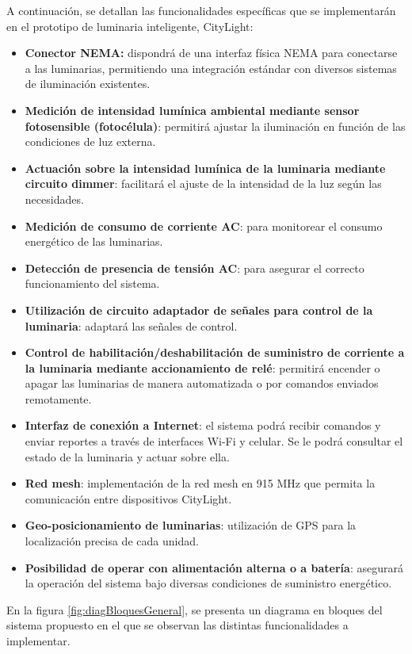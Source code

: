 \documentclass[
11pt, %
]{charter}
\begin{document}
A continuación, se detallan las funcionalidades específicas que se implementarán en el prototipo de luminaria inteligente, CityLight:

\begin{itemize}
		\item \textbf{Conector NEMA:} dispondrá de una interfaz física NEMA para conectarse a las luminarias, permitiendo una integración estándar con diversos sistemas de iluminación existentes.
        \item \textbf{Medición de intensidad lumínica ambiental mediante sensor fotosensible (fotocélula)}: permitirá ajustar la iluminación en función de las condiciones de luz externa.
        \item \textbf{Actuación sobre la intensidad lumínica de la luminaria mediante circuito dimmer}: facilitará el ajuste de la intensidad de la luz según las necesidades.
        \item \textbf{Medición de consumo de corriente AC}: para monitorear el consumo energético de las luminarias.
        \item \textbf{Detección de presencia de tensión AC}: para asegurar el correcto funcionamiento del sistema.
        \item \textbf{Utilización de circuito adaptador de señales para control de la luminaria}: adaptará las señales de control.
        \item \textbf{Control de habilitación/deshabilitación de suministro de corriente a la luminaria mediante accionamiento de relé}: permitirá encender o apagar las luminarias de manera automatizada o por comandos enviados remotamente.
        \item \textbf{Interfaz de conexión a Internet}: el sistema podrá recibir comandos y enviar reportes a través de interfaces Wi-Fi y celular. Se le podrá consultar el estado de la luminaria y actuar sobre ella.
        \item \textbf{Red mesh}: implementación de la red mesh en 915 MHz que permita la comunicación entre dispositivos CityLight. 
        \item \textbf{Geo-posicionamiento de luminarias}: utilización de GPS para la localización precisa de cada unidad.
        \item \textbf{Posibilidad de operar con alimentación alterna o a batería}:  asegurará la operación del sistema bajo diversas condiciones de suministro energético.
\end{itemize}

En la figura \ref{fig:diagBloquesGeneral}, se presenta un diagrama en bloques del sistema propuesto en el que se observan las distintas funcionalidades a implementar. 
\end{document}
